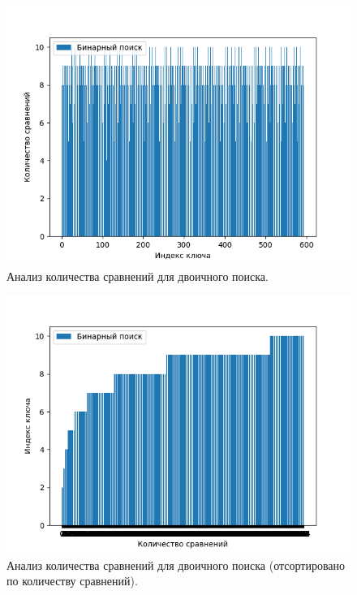 \documentclass[12pt]{report}
\begin{document}
\begin{figure}[H]
	\centering
	\includegraphics[scale=0.8]{bin_search.png}
	\caption{Анализ количества сравнений для двоичного поиска.}
	\label{fig:mpr}

\end{figure}

\begin{figure}[H]
	\centering
	\includegraphics[scale=0.8]{bin_search_sorted.png}
	\caption{Анализ количества сравнений для двоичного поиска (отсортировано по количеству сравнений).}
	\label{fig:mpr}
\end{figure}
\end{document}

